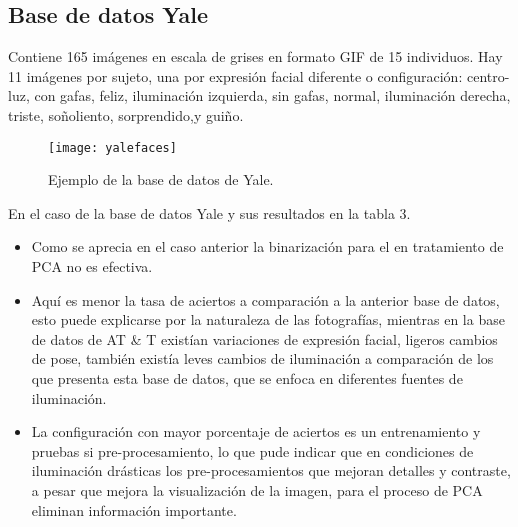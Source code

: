 \subsection{Base de datos Yale}
Contiene 165 imágenes en escala de grises en formato GIF de 15 individuos. Hay 11 imágenes por sujeto, una por expresión facial diferente o configuración: centro-luz, con gafas, feliz, iluminación izquierda, sin gafas, normal, iluminación derecha, triste, soñoliento, sorprendido,y guiño.
\begin{figure}[h]
    \center
    \texttt{[image: yalefaces]}
    \caption{Ejemplo de la base de datos de Yale.}
\end{figure}
En el caso de la base de datos Yale y sus resultados en la tabla 3.
\begin{itemize}
\item Como se aprecia en el caso anterior la binarización para el en tratamiento de \ac{PCA} no es efectiva.
\item Aquí es menor la tasa de aciertos a comparación a la anterior base de datos, esto puede explicarse por la naturaleza de las fotografías, mientras en la base de datos de AT \& T existían variaciones de expresión facial, ligeros cambios de pose, también existía leves cambios de iluminación a comparación de los que presenta esta base de datos, que se enfoca en diferentes fuentes de iluminación.
\item La configuración con mayor porcentaje de aciertos es un entrenamiento y pruebas si pre-procesamiento, lo que pude indicar que en condiciones de iluminación drásticas los pre-procesamientos que mejoran detalles y contraste, a pesar que mejora la visualización de la imagen, para el proceso de \ac{PCA} eliminan información importante.
\end{itemize}
